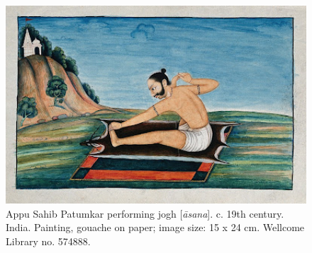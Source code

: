 \begin{landscape}
\begin{figure}[ht]
	\centering
  \includegraphics[width=1.3\textwidth]{pics/royalyogi3.jpg}
	\caption{Appu Sahib Patumkar performing jogh [\textit{āsana}]. c. 19th century. India. Painting, gouache on paper; image size: 15 x 24 cm. Wellcome Library no. 574888.}
	\label{fig:royalyogi3}
\end{figure}
\end{landscape}

